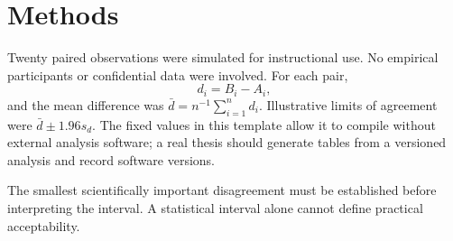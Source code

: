 \chapter{Methods}
\label{chap:methods}

Twenty paired observations were simulated for instructional use. No empirical
participants or confidential data were involved. For each pair,
\begin{equation}
  d_i=B_i-A_i,
  \label{eq:difference}
\end{equation}
and the mean difference was $\bar d=n^{-1}\sum_{i=1}^{n}d_i$. Illustrative
limits of agreement were $\bar d\pm1.96s_d$. The fixed values in this template
allow it to compile without external analysis software; a real thesis should
generate tables from a versioned analysis and record software versions.

The smallest scientifically important disagreement must be established before
interpreting the interval. A statistical interval alone cannot define
practical acceptability.
